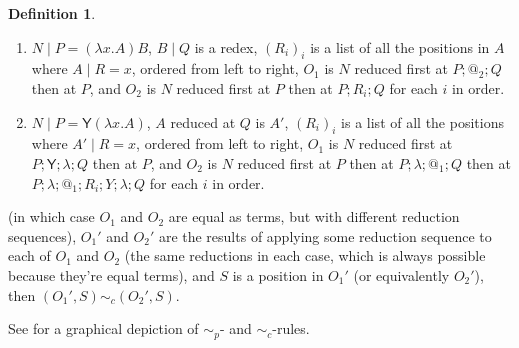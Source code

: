 \documentclass{article}
\newcommand{\tY}{\mathsf{Y}}
\theoremstyle{definition}
\newtheorem{definition}{Definition}
\theoremstyle{lemma}
\theoremstyle{remark}
\begin{document}
\begin{definition}
\begin{enumerate}
\begin{enumerate}
        \item $N \mid P = (\lambda x. A) B$, $B \mid Q$ is a redex, $(R_i)_i$ is a list of all the positions in $A$ where $A \mid R = x$, ordered from left to right, $O_1$ is $N$ reduced first at $P ; @_2 ; Q$ then at $P$, and $O_2$ is $N$ reduced first at $P$ then at $P;R_i;Q$ for each $i$ in order.
        
        \item $N \mid P = \tY (\lambda x. A)$, $A$ reduced at $Q$ is $A'$, $(R_i)_i$ is a list of all the positions where $A' \mid R  = x$, ordered from left to right, $O_1$ is $N$ reduced first at $P;\tY;\lambda;Q$ then at $P$, and $O_2$ is $N$ reduced first at $P$ then at $P;\lambda;@_1;Q$ then at $P;\lambda;@_1;R_i;Y;\lambda;Q$ for each $i$ in order.
    \end{enumerate}
    (in which case $O_1$ and $O_2$ are equal as terms, but with different reduction sequences), $O_1'$ and $O_2'$ are the results of applying some reduction sequence to each of $O_1$ and $O_2$ (the same reductions in each case, which is always possible because they're equal terms), and $S$ is a position in $O_1'$ (or equivalently $O_2'$), then $(O_1',S) \sim_c (O_2',S)$.
\end{enumerate}
See  for a graphical depiction of $\sim_p$- and $\sim_c$-rules.
\end{definition}
\end{document}
